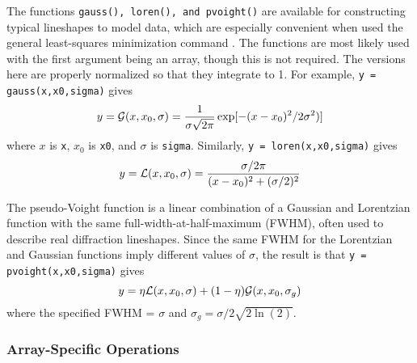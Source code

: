 The functions {\tt{gauss(), loren(), {\rm{and}} pvoight()}} are available
for constructing typical lineshapes to model data, which are especially
convenient when used the general least-squares minimization command
{}.  The functions are most likely used with the first
argument being an array, though this is not required.  The versions here
are properly normalized so that they integrate to 1.  For example,
{\texttt{y = gauss(x,x0,sigma)}}
gives
\begin{equation} 
  y = {{\cal G}(x,x_0,\sigma)} = {{1}\over{\sigma\sqrt{2\pi}}} \exp[ - (x-x_0)^2/ 2\sigma^2)]
\end{equation} 
\noindent
where $x$ is {\tt{x}}, $x_0$ is {\tt{x0}}, and $\sigma$ is {\tt{sigma}}.
Similarly, {\texttt{y = loren(x,x0,sigma)}} gives 
\begin{equation} 
  y = {{\cal L}(x,x_0,\sigma)} = {{{\sigma}/{2\pi}}\over{(x-x_0)^2 + ({\sigma}/2)^2}}
\end{equation} 
\noindent

The pseudo-Voight function is a linear combination of a Gaussian and
Lorentzian function with the same full-width-at-half-maximum (FWHM), often
used to describe real diffraction lineshapes.  Since the same FWHM for the
Lorentzian and Gaussian functions imply different values of $\sigma$, the
result is that {\texttt{y = pvoight(x,x0,sigma)}} gives
\begin{equation} 
  y = \eta {{\cal L}(x,x_0,\sigma)} + (1-\eta) {{\cal G}(x,x_0,\sigma_g)}
\end{equation} 
\noindent
where the specified FWHM = $\sigma$ and $\sigma_g = \sigma /
2\sqrt{2\ln(2)}$.



\subsubsection{Array-Specific Operations}


